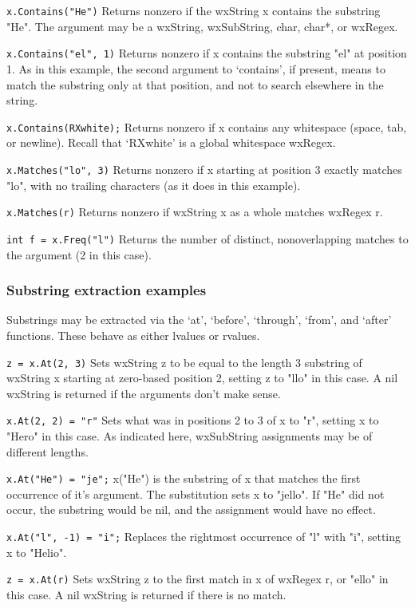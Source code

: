 {\tt x.Contains("He")} 
Returns nonzero if the wxString x contains the substring "He". The
argument may be a wxString, wxSubString, char, char*, or wxRegex.

{\tt x.Contains("el", 1)} 
Returns nonzero if x contains the substring "el" at position 1.
As in this example, the second argument to `contains', if present,
means to match the substring only at that position, and not to
search elsewhere in the string.

{\tt x.Contains(RXwhite);} 
Returns nonzero if x contains any whitespace (space, tab, or
newline). Recall that `RXwhite' is a global whitespace wxRegex.

{\tt x.Matches("lo", 3)} 
Returns nonzero if x starting at position 3 exactly matches "lo",
with no trailing characters (as it does in this example).

{\tt x.Matches(r)} 
Returns nonzero if wxString x as a whole matches wxRegex r.

{\tt int f = x.Freq("l")} 
Returns the number of distinct, nonoverlapping matches to the
argument (2 in this case).

\subsubsection{Substring extraction examples}

Substrings may be extracted via the `at', `before', `through',
`from', and `after' functions.  These behave as either lvalues or
rvalues.

{\tt z = x.At(2, 3)} 
Sets wxString z to be equal to the length 3 substring of wxString x
starting at zero-based position 2, setting z to "llo" in this
case. A nil wxString is returned if the arguments don't make sense.

{\tt x.At(2, 2) = "r"} 
Sets what was in positions 2 to 3 of x to "r", setting x to "Hero"
in this case. As indicated here, wxSubString assignments may be of
different lengths.

{\tt x.At("He") = "je";} 
x("He") is the substring of x that matches the first occurrence of
it's argument. The substitution sets x to "jello". If "He" did not
occur, the substring would be nil, and the assignment would have
no effect.

{\tt x.At("l", -1) = "i";} 
Replaces the rightmost occurrence of "l" with "i", setting x to
"Helio".

{\tt z = x.At(r)} 
Sets wxString z to the first match in x of wxRegex r, or "ello" in this
case. A nil wxString is returned if there is no match.

